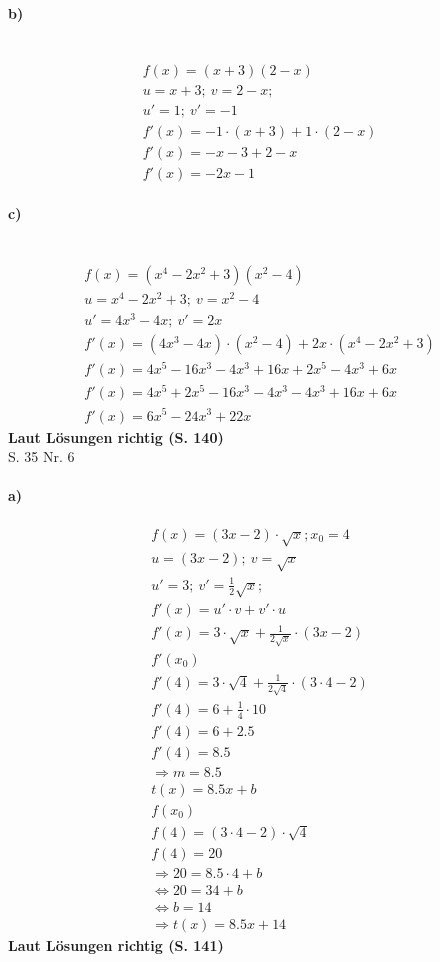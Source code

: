 \documentclass[12pt,a4paper]{report}
\newcommand{\richtig}[1]{\color{ForestGreen}\textbf{
	Laut Lösungen richtig (S. #1)
}\color{black}}
\begin{document}
	\paragraph{b)} \mbox{} \\
	\begin{align*}
		f(x) = (x+3)(2-x) \\
		u=x+3;\ v=2-x;\\
		u'=1;\ v'=-1 \\
		f'(x) = -1\cdot (x+3)+1 \cdot (2-x) \\
		f'(x) = -x - 3 + 2 - x \\
		f'(x) = -2x - 1
	\end{align*}
	\paragraph{c)} \mbox{} \\
	\begin{align*}
		f(x) = (x^4 - 2x^2 + 3)(x^2 - 4) \\
		u= x^4 - 2x^2 + 3;\ v=x^2-4 \\
		u'=4x^3 - 4x;\ v'=2x \\
		f'(x) = (4x^3 -4x) \cdot (x^2-4) + 2x \cdot (x^4 - 2x^2 + 3) \\
		f'(x) = 4x^5 - 16x^3 - 4x^3 + 16x + 2x^5 - 4x^3 + 6x \\
		f'(x) = 4x^5 + 2x^5 - 16x^3 - 4x^3 - 4x^3 + 16x + 6x \\
		f'(x) = 6x^5 - 24x^3 + 22x
	\end{align*}
	\richtig{140}
	\noindent \\[0.5cm]
	\Large S. 35 Nr. 6
	\large
	\noindent
	\paragraph{a)}
	\begin{align*}
		f(x) = (3x - 2) \cdot \sqrt{x}; x_0 = 4 \\
		u = (3x -2);\ v=\sqrt{x} \\
		u'= 3;\ v'=\frac{1}{2}\sqrt{x}; \\
		f'(x) = u' \cdot v + v' \cdot u \\
		f'(x) = 3 \cdot \sqrt{x} + \frac{1}{2\sqrt{x} }\cdot (3x - 2) \\
		f'(x_0) \\
		f'(4) = 3 \cdot \sqrt{4} + \frac{1}{2\sqrt{4}} \cdot (3\cdot4 - 2) \\
		f'(4) = 6 + \frac{1}{4} \cdot 10 \\
		f'(4) = 6 + 2.5 \\
		f'(4) = 8.5 \\
		\Rightarrow m=8.5 \\
		t(x) = 8.5x+b \\
		f(x_0)\\
		f(4) = (3\cdot 4-2)\cdot \sqrt{4} \\
		f(4) = 20 \\
		\Rightarrow 20 = 8.5 \cdot 4 + b \\
		\Leftrightarrow 20 = 34 + b\\
		\Leftrightarrow b = 14 \\
		\Rightarrow t(x) = 8.5x + 14
	\end{align*}
	\richtig{141}
	\newpage
\end{document}
